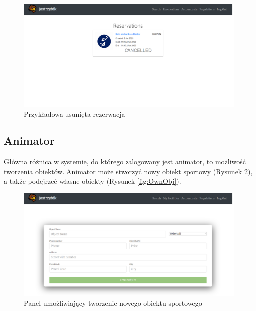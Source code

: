 \documentclass[a4paper,11pt]{article}
\begin{document}
    \begin{figure}[H] 
    	\begin{center}
    		\includegraphics[width=1\textwidth]{img3/CancelUser.png}
            \caption{Przykładowa usunięta rezerwacja}
            \label{fig:CancelUser}
    	\end{center}
    \end{figure}  
    
    \subsection{Animator}
    
    Główna różnica w systemie, do którego zalogowany jest animator, to możliwość tworzenia obiektów. Animator może stworzyć nowy obiekt sportowy (Rysunek \ref{fig:CreateObj}), a także podejrzeć własne obiekty (Rysunek \ref{fig:OwnObj}). 
 
    \begin{figure}[H] 
    	\begin{center}
    		\includegraphics[width=1\textwidth]{img3/CreateObj.png}
            \caption{Panel umożliwiający tworzenie nowego obiektu sportowego}
            \label{fig:CreateObj}
    	\end{center}
    \end{figure} 
    
\end{document}
